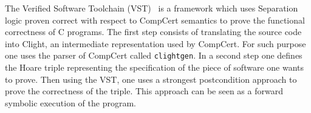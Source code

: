 The Verified Software Toolchain (VST)~\cite{cao2018vst-floyd} is a framework
which uses Separation logic proven correct with respect to CompCert semantics
to prove the functional correctness of C programs.
The first step consists of translating the source code into Clight,
an intermediate representation used by CompCert.
For such purpose one uses the parser of CompCert called \texttt{clightgen}.
In a second step one defines the Hoare triple representing the specification of
the piece of software one wants to prove. Then using the VST, one uses a strongest
postcondition approach to prove the correctness of the triple.
This approach can be seen as a forward symbolic execution of the program.

